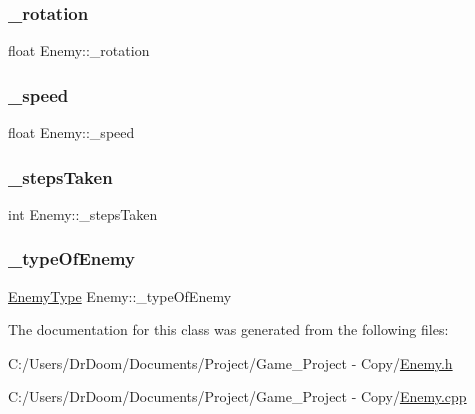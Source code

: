 \mbox{\label{class_enemy_ad00fabd2ca45f308cf3b0ead95c9bb82}} 
\subsubsection{\texorpdfstring{\+\_\+rotation}{\_rotation}}
{\footnotesize\ttfamily float Enemy\+::\+\_\+rotation\hspace{0.3cm}{\ttfamily [private]}}

\mbox{\label{class_enemy_a5ad8a827b28dd24331a434d1993d5c01}} 
\subsubsection{\texorpdfstring{\+\_\+speed}{\_speed}}
{\footnotesize\ttfamily float Enemy\+::\+\_\+speed\hspace{0.3cm}{\ttfamily [private]}}

\mbox{\label{class_enemy_a6c795cbaf685c2b4824601219c39192b}} 
\subsubsection{\texorpdfstring{\+\_\+steps\+Taken}{\_stepsTaken}}
{\footnotesize\ttfamily int Enemy\+::\+\_\+steps\+Taken\hspace{0.3cm}{\ttfamily [private]}}

\mbox{\label{class_enemy_a28e9fad6f896986b88f53895f6bba866}} 
\subsubsection{\texorpdfstring{\+\_\+type\+Of\+Enemy}{\_typeOfEnemy}}
{\footnotesize\ttfamily \hyperlink{_enemy_8h_ac3e413a86119db4b031458c7259e268e}{Enemy\+Type} Enemy\+::\+\_\+type\+Of\+Enemy\hspace{0.3cm}{\ttfamily [private]}}



The documentation for this class was generated from the following files\+:\begin{DoxyCompactItemize}
\item 
C\+:/\+Users/\+Dr\+Doom/\+Documents/\+Project/\+Game\+\_\+\+Project -\/ Copy/\hyperlink{_enemy_8h}{Enemy.\+h}\item 
C\+:/\+Users/\+Dr\+Doom/\+Documents/\+Project/\+Game\+\_\+\+Project -\/ Copy/\hyperlink{_enemy_8cpp}{Enemy.\+cpp}\end{DoxyCompactItemize}
